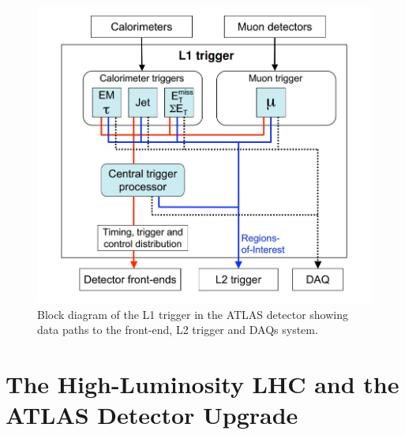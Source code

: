 \begin{figure}[H]
  \centering
  \includegraphics[scale=0.4]{figs/ch3/L1-diagram.jpg}
  \caption{ Block diagram of the L1 trigger in the ATLAS detector showing data paths to the front-end, L2 trigger and DAQs system. \cite{atlas}}
\label{fig:3.14}
\end{figure}

\section{The High-Luminosity LHC and the ATLAS Detector Upgrade}\label{sec:hllhc-itk}

